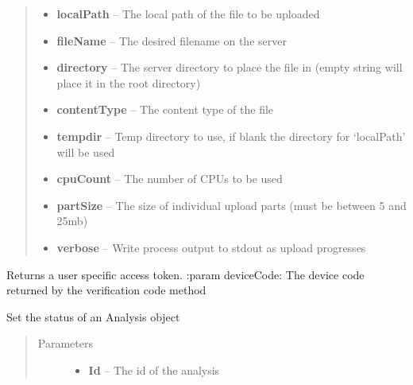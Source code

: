 \documentclass[letterpaper,10pt,english]{sphinxmanual}
\begin{document}
\begin{fulllineitems}
\begin{fulllineitems}
\begin{quote}
\begin{description}
\begin{itemize}
\item {} 
\textbf{localPath} -- The local path of the file to be uploaded

\item {} 
\textbf{fileName} -- The desired filename on the server

\item {} 
\textbf{directory} -- The server directory to place the file in (empty string will place it in the root directory)

\item {} 
\textbf{contentType} -- The content type of the file

\item {} 
\textbf{tempdir} -- Temp directory to use, if blank the directory for `localPath' will be used

\item {} 
\textbf{cpuCount} -- The number of CPUs to be used

\item {} 
\textbf{partSize} -- The size of individual upload parts (must be between 5 and 25mb)

\item {} 
\textbf{verbose} -- Write process output to stdout as upload progresses

\end{itemize}

\end{description}\end{quote}

\end{fulllineitems}


\begin{fulllineitems}
\label{Available modules:BaseSpacePy.api.BaseSpaceAPI.BaseSpaceAPI.obtainAccessToken}
Returns a user specific access token.    
:param deviceCode: The device code returned by the verification code method

\end{fulllineitems}


\begin{fulllineitems}
\label{Available modules:BaseSpacePy.api.BaseSpaceAPI.BaseSpaceAPI.setAppSessionState}
Set the status of an Analysis object
\begin{quote}\begin{description}
\item[{Parameters}] \leavevmode\begin{itemize}
\item {} 
\textbf{Id} -- The id of the analysis


\end{itemize}
\end{description}
\end{quote}
\end{fulllineitems}
\end{fulllineitems}
\end{document}
